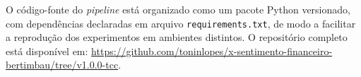 O código-fonte do \textit{pipeline} está organizado como um pacote Python versionado, com dependências declaradas em arquivo \texttt{requirements.txt}, de modo a facilitar a reprodução dos experimentos em ambientes distintos. O repositório completo está disponível em: \url{https://github.com/toninlopes/x-sentimento-financeiro-bertimbau/tree/v1.0.0-tcc}.